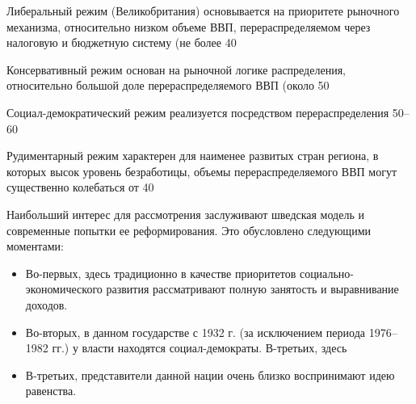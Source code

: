 \documentclass[14pt,a4paper]{article}
\begin{document}
    Либеральный режим (Великобритания) основывается на приоритете рыночного механизма, относительно низком объеме ВВП, перераспределяемом через налоговую и бюджетную систему (не более 40%
    \par
    Консервативный режим основан на рыночной логике распределения, относительно большой доле перераспределяемого ВВП (около 50%
    \par
    Социал-демократический режим реализуется посредством перераспределения 50–60%
    \par
    Рудиментарный режим характерен для наименее развитых стран региона, в которых высок уровень безработицы, объемы перераспределяемого ВВП могут существенно колебаться от 40%
    \par
    Наибольший интерес для рассмотрения заслуживают шведская модель и современные попытки ее реформирования. Это обусловлено следующими моментами:
    \begin{itemize}
        \item Во-первых, здесь традиционно в качестве приоритетов социально-экономического развития рассматривают полную занятость и выравнивание доходов.
        \item Во-вторых, в данном государстве с 1932 г. (за исключением периода 1976–1982 гг.) у власти находятся социал-демократы. В-третьих, здесь
        \item В-третьих, представители данной нации очень близко воспринимают идею равенства.
    \end{itemize}
\end{document}
